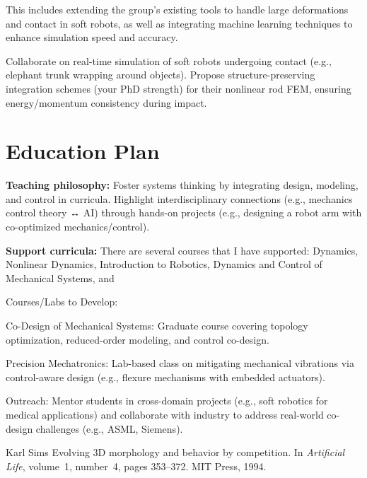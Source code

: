 \documentclass[12pt]{article}
\begin{document}
This includes extending the group’s existing tools to handle large deformations and contact in soft robots, as well as integrating machine learning techniques to enhance simulation speed and accuracy.

Collaborate on real-time simulation of soft robots undergoing contact (e.g., elephant trunk wrapping around objects). Propose structure-preserving integration schemes (your PhD strength) for their nonlinear rod FEM, ensuring energy/momentum consistency during impact.

\section*{Education Plan}

\hspace{5mm} \textbf{Teaching philosophy:} Foster systems thinking by integrating design, modeling, and control in curricula. Highlight interdisciplinary connections (e.g., mechanics  control theory ↔ AI) through hands-on projects (e.g., designing a robot arm with co-optimized mechanics/control).

\textbf{Support curricula:} There are several courses that I have supported: Dynamics, Nonlinear Dynamics, Introduction to Robotics, Dynamics and Control of Mechanical Systems, and 


Courses/Labs to Develop:

    Co-Design of Mechanical Systems: Graduate course covering topology optimization, reduced-order modeling, and control co-design.

    Precision Mechatronics: Lab-based class on mitigating mechanical vibrations via control-aware design (e.g., flexure mechanisms with embedded actuators).

Outreach:
    Mentor students in cross-domain projects (e.g., soft robotics for medical applications) and collaborate with industry to address real-world co-design challenges (e.g., ASML, Siemens).

  


\begin{thebibliography}{1}

Karl Sims
\newblock Evolving 3D morphology and behavior by competition.
\newblock In {\em Artificial Life}, volume~1, number~4, pages 353--372. 
MIT Press, 1994.


\end{thebibliography}
\end{document}

